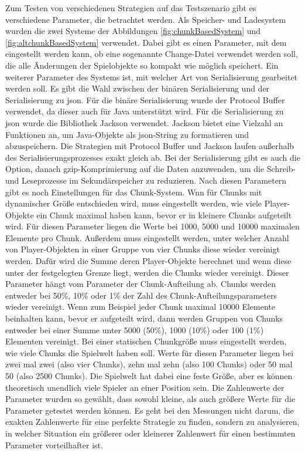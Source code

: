 Zum Testen von verschiedenen Strategien auf das Testszenario gibt es verschiedene Parameter, die betrachtet werden. Als Speicher- und Ladesystem wurden die zwei Systeme der Abbildungen \ref{fig:chunkBasedSystem} und \ref{fig:altchunkBasedSystem} verwendet. Dabei gibt es einen Parameter, mit dem eingestellt werden kann, ob eine sogenannte Change-Datei verwendet werden soll, die alle Änderungen der Spielobjekte so kompakt wie möglich speichert. Ein weiterer Parameter des Systems ist, mit welcher Art von Serialisierung gearbeitet werden soll. Es gibt die Wahl zwischen der binären Serialisierung und der Serialisierung zu \ac{json}. Für die binäre Serialisierung wurde der Protocol Buffer verwendet, da dieser auch für Java unterstützt wird. Für die Serialisierung zu \ac{json} wurde die Bibliothek Jackson verwendet. Jackson bietet eine Vielzahl an Funktionen an, um Java-Objekte als \ac{json}-String zu formatieren und abzuspeichern.\cite{githubGitHubFasterXMLjackson} Die Strategien mit Protocol Buffer und Jackson laufen außerhalb des Serialisierungsprozesses exakt gleich ab. Bei der Serialisierung gibt es auch die Option, danach \ac{gzip}-Komprimierung auf die Daten anzuwenden, um die Schreib- und Leseprozesse im Sekundärspeicher zu reduzieren. Nach diesen Parametern gibt es noch Einstellungen für das Chunk-System. Wnn für Chunks mit dynamischer Größe entschieden wird, muss eingestellt werden, wie viele Player-Objekte ein Chunk maximal haben kann, bevor er in kleinere Chunks aufgeteilt wird. Für diesen Parameter liegen die Werte bei 1000, 5000 und 10000 maximalen Elemente pro Chunk. Außerdem muss eingestellt werden, unter welcher Anzahl von Player-Objekten in einer Gruppe von vier Chunks diese wieder vereinigt werden. Dafür wird die Summe deren Player-Objekte berechnet und wenn diese unter der festgelegten Grenze liegt, werden die Chunks wieder vereinigt. Dieser Parameter hängt vom Parameter der Chunk-Aufteilung ab. Chunks werden entweder bei 50\%, 10\% oder 1\% der Zahl des Chunk-Aufteilungsparameters wieder vereinigt. Wenn zum Beispiel jeder Chunk maximal 10000 Elemente beinhalten kann, bevor er aufgeteilt wird, dann werden Gruppen von Chunks entweder bei einer Summe unter 5000 (50\%), 1000 (10\%) oder 100 (1\%) Elementen vereinigt. Bei einer statischen Chunkgröße muss eingestellt werden, wie viele Chunks die Spielwelt haben soll. Werte für diesen Parameter liegen bei zwei mal zwei (also vier Chunks), zehn mal zehn (also 100 Chunks) oder 50 mal 50 (also 2500 Chunks). Die Spielwelt hat dabei eine feste Größe, aber es können theoretisch unendlich viele Spieler an einer Position sein. Die Zahlenwerte der Parameter wurden so gewählt, dass sowohl kleine, als auch größere Werte für die Parameter getestet werden können. Es geht bei den Messungen nicht darum, die exakten Zahlenwerte für eine perfekte Strategie zu finden, sondern zu analysieren, in welcher Situation ein größerer oder kleinerer Zahlenwert für einen bestimmten Parameter vorteilhafter ist. 

